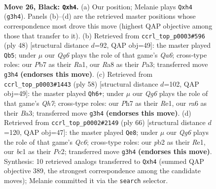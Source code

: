 \documentclass[11pt]{article}
\begin{document}
\clearpage

\begin{figure}[p]\centering
\begin{subfigure}{0.46\textwidth}\centering
\resizebox{\linewidth}{!}{%
\newchessgame
\chessboard[
  setfen={r5k1/pp2r2p/R3p1p1/8/6PP/1N4q1/1P3RB1/2BQ2K1 b - - 0 26},
  showmover=false,
  pgfstyle=straightmove, color=movearrow, markmove={g3-h4}
]}
\caption{}
\end{subfigure}\hfill
\begin{subfigure}{0.46\textwidth}\centering
\resizebox{\linewidth}{!}{%
\newchessgame
\chessboard[
  setfen={2k4r/1bq2prP/Qp6/4Pp2/5P2/P1p1B2R/2P5/R3K3 w Q - 2 25},
  showmover=false,
  pgfstyle=straightmove, color=movearrow, markmove={a6-b5}
]}
\caption{}
\end{subfigure}
\\[4pt]
\begin{subfigure}{0.46\textwidth}\centering
\resizebox{\linewidth}{!}{%
\newchessgame
\chessboard[
  setfen={2r2kr1/p2qbp1Q/4b3/8/8/BP4P1/P2P1P1P/R3R1K1 w - - 5 30},
  showmover=false,
  pgfstyle=straightmove, color=movearrow, markmove={h7-h6}
]}
\caption{}
\end{subfigure}\hfill
\begin{subfigure}{0.46\textwidth}\centering
\resizebox{\linewidth}{!}{%
\newchessgame
\chessboard[
  setfen={2b5/2p3qk/p1Qr1b1p/3n4/1p6/3PB3/PPP3PP/1K2RR2 w - - 3 34},
  showmover=false,
  pgfstyle=straightmove, color=movearrow, markmove={c6-e8}
]}
\caption{}
\end{subfigure}
\caption{\textbf{Move 26, Black: \texttt{Qxh4}.} (a) Our position; Melanie plays \texttt{Qxh4} (\texttt{g3h4}). Panels (b)--(d) are the retrieved master positions whose correspondence most drove this move (highest QAP objective among those that transfer to it). (b) Retrieved from \texttt{ccrl\_top\_p0003\#596} (ply 48) [structural distance $d$=92, QAP obj=49]: the master played \texttt{Qb5}; under $\mu$ our \emph{Qg6} plays the role of that game's \emph{Qa6}; cross-type roles: our \emph{P}b7 as their \emph{R}a1, our \emph{R}a8 as their \emph{P}a3; transferred move \texttt{g3h4} \textbf{(endorses this move)}. (c) Retrieved from \texttt{ccrl\_top\_p0003\#1443} (ply 58) [structural distance $d$=102, QAP obj=49]: the master played \texttt{Qh6+}; under $\mu$ our \emph{Qg6} plays the role of that game's \emph{Qh7}; cross-type roles: our \emph{P}h7 as their \emph{R}e1, our \emph{r}a6 as their \emph{B}a3; transferred move \texttt{g3h4} \textbf{(endorses this move)}. (d) Retrieved from \texttt{ccrl\_top\_p0002\#2149} (ply 66) [structural distance $d$=120, QAP obj=47]: the master played \texttt{Qe8}; under $\mu$ our \emph{Qg6} plays the role of that game's \emph{Qc6}; cross-type roles: our \emph{p}b2 as their \emph{R}e1, our \emph{b}c1 as their \emph{P}c2; transferred move \texttt{g3h4} \textbf{(endorses this move)}. Synthesis: 10 retrieved analogs transferred to \texttt{Qxh4} (summed QAP objective 389, the strongest correspondence among the candidate moves); Melanie committed it via the \texttt{search} selector.}
\label{fig:thought-m51}
\end{figure}
\end{document}
